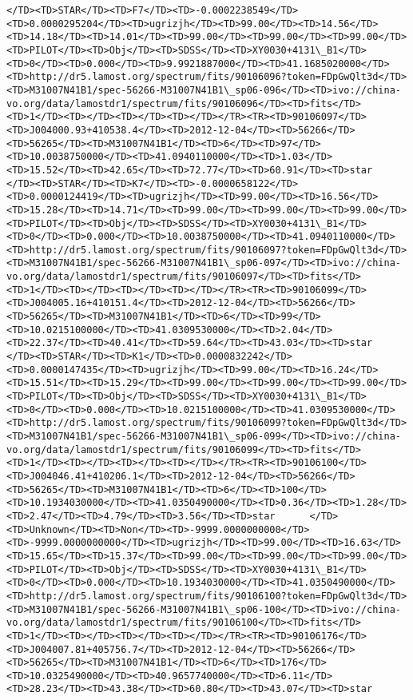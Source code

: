 \documentclass[11pt]{article}
\begin{document}
\begin{Verbatim}[commandchars=\\\{\}]
</TD><TD>STAR</TD><TD>F7</TD><TD>-0.0002238549</TD><TD>0.0000295204</TD><TD>ugrizjh</TD><TD>99.00</TD><TD>14.56</TD><TD>14.18</TD><TD>14.01</TD><TD>99.00</TD><TD>99.00</TD><TD>99.00</TD><TD>PILOT</TD><TD>Obj</TD><TD>SDSS</TD><TD>XY0030+4131\_B1</TD><TD>0</TD><TD>0.000</TD><TD>9.9921887000</TD><TD>41.1685020000</TD><TD>http://dr5.lamost.org/spectrum/fits/90106096?token=FDpGwQlt3d</TD><TD>M31007N41B1/spec-56266-M31007N41B1\_sp06-096</TD><TD>ivo://china-vo.org/data/lamostdr1/spectrum/fits/90106096</TD><TD>fits</TD><TD>1</TD><TD></TD><TD></TD><TD></TD></TR><TR><TD>90106097</TD><TD>J004000.93+410538.4</TD><TD>2012-12-04</TD><TD>56266</TD><TD>56265</TD><TD>M31007N41B1</TD><TD>6</TD><TD>97</TD><TD>10.0038750000</TD><TD>41.0940110000</TD><TD>1.03</TD><TD>15.52</TD><TD>42.65</TD><TD>72.77</TD><TD>60.91</TD><TD>star      </TD><TD>STAR</TD><TD>K7</TD><TD>-0.0000658122</TD><TD>0.0000124419</TD><TD>ugrizjh</TD><TD>99.00</TD><TD>16.56</TD><TD>15.28</TD><TD>14.71</TD><TD>99.00</TD><TD>99.00</TD><TD>99.00</TD><TD>PILOT</TD><TD>Obj</TD><TD>SDSS</TD><TD>XY0030+4131\_B1</TD><TD>0</TD><TD>0.000</TD><TD>10.0038750000</TD><TD>41.0940110000</TD><TD>http://dr5.lamost.org/spectrum/fits/90106097?token=FDpGwQlt3d</TD><TD>M31007N41B1/spec-56266-M31007N41B1\_sp06-097</TD><TD>ivo://china-vo.org/data/lamostdr1/spectrum/fits/90106097</TD><TD>fits</TD><TD>1</TD><TD></TD><TD></TD><TD></TD></TR><TR><TD>90106099</TD><TD>J004005.16+410151.4</TD><TD>2012-12-04</TD><TD>56266</TD><TD>56265</TD><TD>M31007N41B1</TD><TD>6</TD><TD>99</TD><TD>10.0215100000</TD><TD>41.0309530000</TD><TD>2.04</TD><TD>22.37</TD><TD>40.41</TD><TD>59.64</TD><TD>43.03</TD><TD>star      </TD><TD>STAR</TD><TD>K1</TD><TD>0.0000832242</TD><TD>0.0000147435</TD><TD>ugrizjh</TD><TD>99.00</TD><TD>16.24</TD><TD>15.51</TD><TD>15.29</TD><TD>99.00</TD><TD>99.00</TD><TD>99.00</TD><TD>PILOT</TD><TD>Obj</TD><TD>SDSS</TD><TD>XY0030+4131\_B1</TD><TD>0</TD><TD>0.000</TD><TD>10.0215100000</TD><TD>41.0309530000</TD><TD>http://dr5.lamost.org/spectrum/fits/90106099?token=FDpGwQlt3d</TD><TD>M31007N41B1/spec-56266-M31007N41B1\_sp06-099</TD><TD>ivo://china-vo.org/data/lamostdr1/spectrum/fits/90106099</TD><TD>fits</TD><TD>1</TD><TD></TD><TD></TD><TD></TD></TR><TR><TD>90106100</TD><TD>J004046.41+410206.1</TD><TD>2012-12-04</TD><TD>56266</TD><TD>56265</TD><TD>M31007N41B1</TD><TD>6</TD><TD>100</TD><TD>10.1934030000</TD><TD>41.0350490000</TD><TD>0.36</TD><TD>1.28</TD><TD>2.47</TD><TD>4.79</TD><TD>3.56</TD><TD>star      </TD><TD>Unknown</TD><TD>Non</TD><TD>-9999.0000000000</TD><TD>-9999.0000000000</TD><TD>ugrizjh</TD><TD>99.00</TD><TD>16.63</TD><TD>15.65</TD><TD>15.37</TD><TD>99.00</TD><TD>99.00</TD><TD>99.00</TD><TD>PILOT</TD><TD>Obj</TD><TD>SDSS</TD><TD>XY0030+4131\_B1</TD><TD>0</TD><TD>0.000</TD><TD>10.1934030000</TD><TD>41.0350490000</TD><TD>http://dr5.lamost.org/spectrum/fits/90106100?token=FDpGwQlt3d</TD><TD>M31007N41B1/spec-56266-M31007N41B1\_sp06-100</TD><TD>ivo://china-vo.org/data/lamostdr1/spectrum/fits/90106100</TD><TD>fits</TD><TD>1</TD><TD></TD><TD></TD><TD></TD></TR><TR><TD>90106176</TD><TD>J004007.81+405756.7</TD><TD>2012-12-04</TD><TD>56266</TD><TD>56265</TD><TD>M31007N41B1</TD><TD>6</TD><TD>176</TD><TD>10.0325490000</TD><TD>40.9657740000</TD><TD>6.11</TD><TD>28.23</TD><TD>43.38</TD><TD>60.80</TD><TD>43.07</TD><TD>star 
\end{Verbatim}
\end{document}
